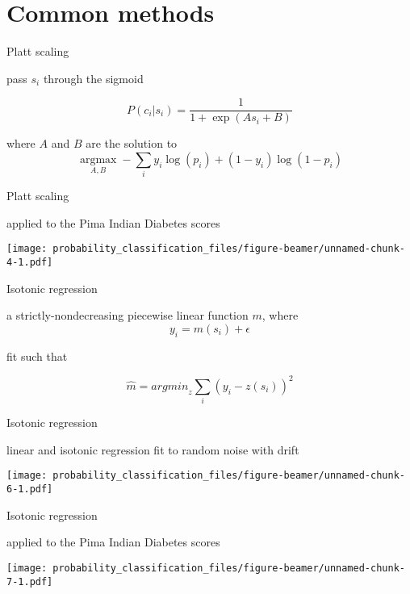 \documentclass[ignorenonframetext,]{beamer}
\begin{document}
\section{Common methods}\label{common-methods}

\begin{frame}{Platt scaling}

pass \(s_i\) through the sigmoid

\[P(c_i | s_i) = \frac{1}{1 + \exp(As_i + B)}\]

where \(A\) and \(B\) are the solution to
\[\underset{A, B}{\operatorname{argmax}} - \sum\limits_{i} y_i \log(p_i) + (1 - y_i) \log(1- p_i)\]

\end{frame}

\begin{frame}{Platt scaling}

applied to the Pima Indian Diabetes scores

\texttt{[image: probability\_classification\_files/figure-beamer/unnamed-chunk-4-1.pdf]}

\end{frame}

\begin{frame}{Isotonic regression}

a strictly-nondecreasing piecewise linear function \(m\), where
\[y_i = m(s_i) + \epsilon\]

fit such that

\[\hat{m} = {argmin}_z \sum_i{(y_i-z(s_i)) ^2}\]

\end{frame}

\begin{frame}{Isotonic regression}

linear and isotonic regression fit to random noise with drift

\texttt{[image: probability\_classification\_files/figure-beamer/unnamed-chunk-6-1.pdf]}

\end{frame}

\begin{frame}{Isotonic regression}

applied to the Pima Indian Diabetes scores

\texttt{[image: probability\_classification\_files/figure-beamer/unnamed-chunk-7-1.pdf]}

\end{frame}
\end{document}
